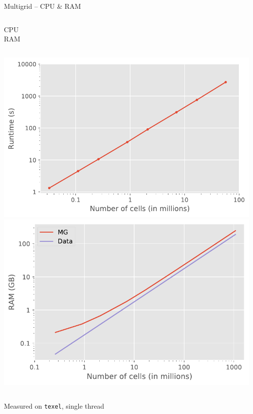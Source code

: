 \documentclass[xcolor=svgnames, aspectratio=169]{beamer}
\begin{document}
  \begin{frame}[t]%
    {Multigrid -- CPU \& RAM}
    \vspace{1em}
    \begin{columns}
        \centering
        \alert{CPU}\\[1em]
        \centering
        \alert{RAM}\\[1em]
    \end{columns}
    \vspace{1em}
    \begin{columns}
        \centering
        \includegraphics[width=\linewidth]{runtime}
        \centering
        \includegraphics[width=\linewidth]{RAM-Usage}
    \end{columns}
    \centering
    \vspace{.5em}
    Measured on \texttt{texel}, single thread
  \end{frame}
\end{document}
